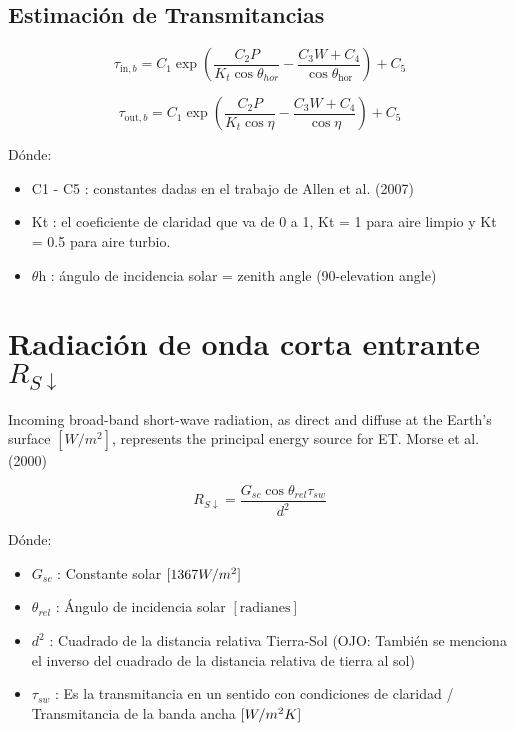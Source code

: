 
\subsection{Estimación de Transmitancias}

\begin{equation}
\tau_{\text{in},b} = C_1 \exp{
\left( 
  \frac{C_2 P}{K_t \cos{\theta_{hor}}} - \frac{C_3 W + C_4}{\cos{\theta_{\text{hor}}}}
\right) 
} + C_5
\label{eq:1}
\end{equation}

\begin{equation}
\tau_{\text{out},b} = C_1 \exp{
\left( 
  \frac{C_2 P}{K_t \cos{\eta}} - \frac{C_3 W + C_4}{\cos{\eta}}
\right) 
} + C_5
\label{eq:1}
\end{equation}

Dónde:
\begin{itemize}
	\item C1 - C5 : constantes dadas en el trabajo de Allen et al. (2007)
	\item Kt : el coeficiente de claridad que va de 0 a 1, Kt = 1 para aire limpio y Kt = 0.5 para aire turbio.  \item $\theta$h : ángulo de incidencia solar = zenith angle (90-elevation angle)
\end{itemize}


\section{Radiación de onda corta entrante $R_{S\downarrow}$}

Incoming broad-band short-wave radiation, as direct and diffuse at the Earth’s surface $[W/m^2]$, represents the principal energy source for ET. Morse et al. (2000)
  
\begin{equation}
R_{S\downarrow} = \frac{G_{sc} \cos\theta_{rel} \tau_{sw}}{d^2}
\label{eq:1}
\end{equation}

Dónde:
\begin{itemize}
    \item $G_{sc}$ : Constante solar $[1367 \space W/m^2]$ 
    \item $\theta_{rel}$ : Ángulo de incidencia solar $[\text{radianes}]$
    \item $d^2$ : Cuadrado de la distancia relativa Tierra-Sol (OJO: También se menciona el inverso del cuadrado de la distancia relativa de tierra al sol)
    \item $\tau_{sw}$ : Es la transmitancia en un sentido con condiciones de claridad / Transmitancia de la banda ancha $[W/m^2 \space K]$
\end{itemize}

